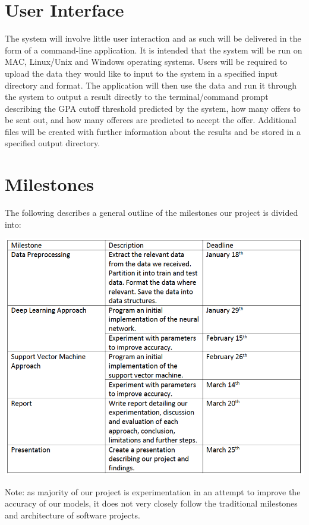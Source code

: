 \documentclass{article}
\begin{document}
\begin{normalsize}
    \newpage

	\section{User Interface}
	The system will involve little user interaction and as such will be delivered in the form of a command-line application. 
	It is intended that the system will be run on MAC, Linux/Unix and Windows operating systems.
	Users will be required to upload the data they would like to input to the system in a specified input directory and format. 
	The application will then use the data and run it through the system to output a result directly to the terminal/command prompt describing the GPA cutoff threshold predicted by the system, how many offers to be sent out, and how many offerees are predicted to accept the offer. 
	Additional files will be created with further information about the results and be stored in a specified output directory.

    \section{Milestones}
    The following describes a general outline of the milestones our project is divided into: \\
    \begin{center}
    \includegraphics[width=400pt]{images/milestones.png} 
    \end{center}
    Note: as majority of our project is experimentation in an attempt to improve the accuracy of our models, it does not very closely follow the traditional milestones and architecture of software projects.

\end{normalsize}
\end{document}
